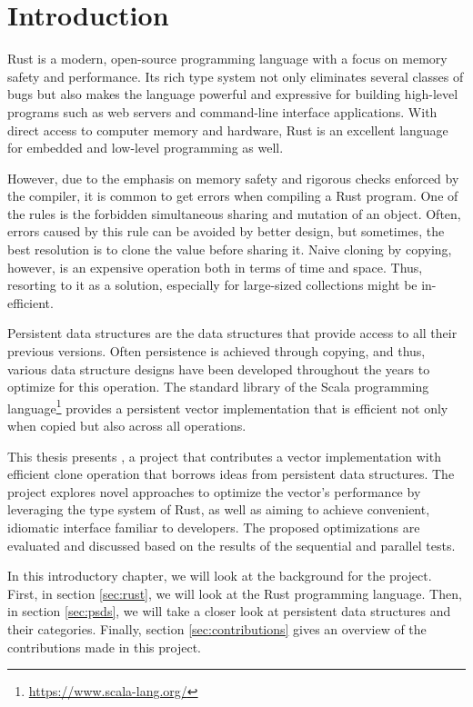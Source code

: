 \chapter{Introduction}

Rust is a modern, open-source programming language with a focus on memory safety and performance. Its rich type system not only eliminates several classes of bugs but also makes the language powerful and expressive for building high-level programs such as web servers and command-line interface applications. With direct access to computer memory and hardware, Rust is an excellent language for embedded and low-level programming as well.

However, due to the emphasis on memory safety and rigorous checks enforced by the compiler, it is common to get errors when compiling a Rust program. One of the rules is the forbidden simultaneous sharing and mutation of an object. Often, errors caused by this rule can be avoided by better design, but sometimes, the best resolution is to clone the value before sharing it. Naive cloning by copying, however, is an expensive operation both in terms of time and space. Thus, resorting to it as a solution, especially for large-sized collections might be in-efficient.

Persistent data structures are the data structures that provide access to all their previous versions. Often persistence is achieved through copying, and thus, various data structure designs have been developed throughout the years to optimize for this operation. The standard library of the Scala programming language\footnote{\url{https://www.scala-lang.org/}} provides a persistent vector implementation that is efficient not only when copied but also across all operations.

This thesis presents \pvecrs{}, a project that contributes a vector implementation with efficient clone operation that borrows ideas from persistent data structures. The project explores novel approaches to optimize the vector’s performance by leveraging the type system of Rust, as well as aiming to achieve convenient, idiomatic interface familiar to developers. The proposed optimizations are evaluated and discussed based on the results of the sequential and parallel tests.

In this introductory chapter, we will look at the background for the \pvecrs{} project. First, in section \ref{sec:rust}, we will look at the Rust programming language. Then, in section \ref{sec:psds}, we will take a closer look at persistent data structures and their categories. Finally, section \ref{sec:contributions} gives an overview of the contributions made in this project.

